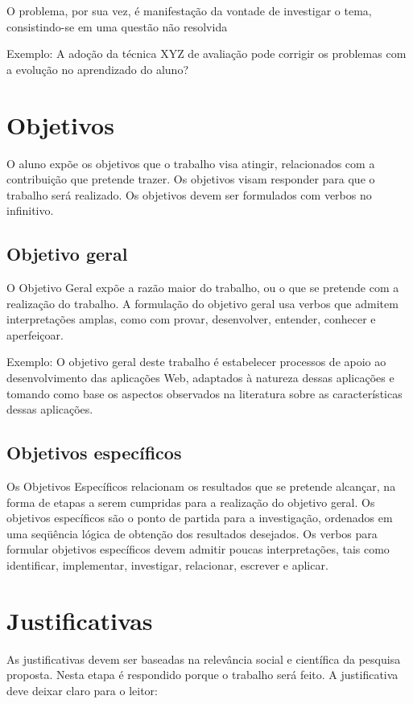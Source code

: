 O problema, por sua vez, é manifestação da vontade de investigar o tema,
consistindo-se em uma questão não resolvida

Exemplo: A adoção da técnica XYZ de avaliação pode corrigir os problemas com a
evolução no aprendizado do aluno?


\section{Objetivos}

O aluno expõe os objetivos que o trabalho visa atingir, relacionados com a
contribuição que pretende trazer. Os objetivos visam responder para que o
trabalho será realizado. Os objetivos devem ser formulados com verbos no
infinitivo.


\subsection{Objetivo geral}

O Objetivo Geral expõe a razão maior do trabalho, ou o que se pretende com a
realização do trabalho. A formulação do objetivo geral usa verbos que admitem
interpretações amplas, como com provar, desenvolver, entender, conhecer e
aperfeiçoar.

Exemplo: O objetivo geral deste trabalho é estabelecer processos de apoio ao
desenvolvimento das aplicações Web, adaptados à natureza dessas aplicações e
tomando como base os aspectos observados na literatura sobre as características
dessas aplicações.


\subsection{Objetivos específicos}

Os Objetivos Específicos relacionam os resultados que se pretende alcançar, na
forma de etapas a serem cumpridas para a realização do objetivo geral. Os
objetivos específicos são o ponto de partida para a investigação, ordenados em
uma seqüência lógica de obtenção dos resultados desejados. Os verbos para
formular objetivos específicos devem admitir poucas interpretações, tais como
identificar, implementar, investigar, relacionar, escrever e aplicar.


\section{Justificativas}

As justificativas devem ser baseadas na relevância social e científica da
pesquisa proposta. Nesta etapa é respondido porque o trabalho será feito. A
justificativa deve deixar claro para o leitor:

